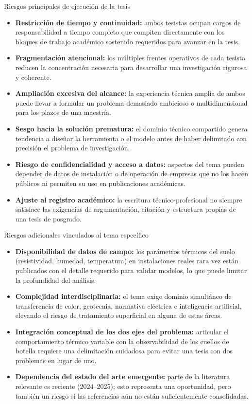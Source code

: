 \documentclass[aspectratio=169]{beamer}
\begin{document}
\begin{frame}{Riesgos principales de ejecución de la tesis}
\justifying
\begin{itemize}[leftmargin=*]
    \item \textbf{Restricción de tiempo y continuidad:} ambos tesistas ocupan cargos de responsabilidad a tiempo completo que compiten directamente con los bloques de trabajo académico sostenido requeridos para avanzar en la tesis.
    \item \textbf{Fragmentación atencional:} los múltiples frentes operativos de cada tesista reducen la concentración necesaria para desarrollar una investigación rigurosa y coherente.
    \item \textbf{Ampliación excesiva del alcance:} la experiencia técnica amplia de ambos puede llevar a formular un problema demasiado ambicioso o multidimensional para los plazos de una maestría.
    \item \textbf{Sesgo hacia la solución prematura:} el dominio técnico compartido genera tendencia a diseñar la herramienta o el modelo antes de haber delimitado con precisión el problema de investigación.
    \item \textbf{Riesgo de confidencialidad y acceso a datos:} aspectos del tema pueden depender de datos de instalación o de operación de empresas que no los hacen públicos ni permiten su uso en publicaciones académicas.
    \item \textbf{Ajuste al registro académico:} la escritura técnico-profesional no siempre satisface las exigencias de argumentación, citación y estructura propias de una tesis de posgrado.
\end{itemize}
\end{frame}

\begin{frame}{Riesgos adicionales vinculados al tema específico}
\justifying
\begin{itemize}[leftmargin=*]
    \item \textbf{Disponibilidad de datos de campo:} los parámetros térmicos del suelo (resistividad, humedad, temperatura) en instalaciones reales rara vez están publicados con el detalle requerido para validar modelos, lo que puede limitar la profundidad del análisis.
    \item \textbf{Complejidad interdisciplinaria:} el tema exige dominio simultáneo de transferencia de calor, geotecnia, normativa eléctrica e inteligencia artificial, elevando el riesgo de tratamiento superficial en alguna de estas áreas.
    \item \textbf{Integración conceptual de los dos ejes del problema:} articular el comportamiento térmico variable con la observabilidad de los cuellos de botella requiere una delimitación cuidadosa para evitar una tesis con dos problemas en lugar de uno.
    \item \textbf{Dependencia del estado del arte emergente:} parte de la literatura relevante es reciente (2024--2025); esto representa una oportunidad, pero también un riesgo si las referencias aún no están suficientemente consolidadas.
\end{itemize}
\end{frame}
\end{document}
